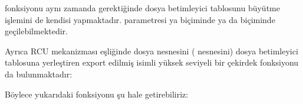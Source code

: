 \documentclass[a4paper,10pt,turkish]{sphinxmanual}
\begin{document}
\begin{sphinxVerbatim}[commandchars=\\\{\}]
\end{sphinxVerbatim}

\sphinxAtStartPar
{} fonksiyonu aynı zamanda gerektiğinde dosya betimleyici tablosunu büyütme
işlemini de kendisi yapmaktadır.  parametresi ya  biçiminde ya da 
biçiminde geçilebilmektedir.

\sphinxAtStartPar
Ayrıca RCU mekanizması eşliğinde dosya nesnesini ( nesnesini) dosya betimleyici
tablosuna yerleştiren export edilmiş  isimli yüksek seviyeli bir çekirdek fonksiyonu
da bulunmaktadır:

\begin{sphinxVerbatim}[commandchars=\\\{\}]
\end{sphinxVerbatim}

\sphinxAtStartPar
Böylece yukarıdaki fonksiyonu şu hale getirebiliriz:
\end{document}
